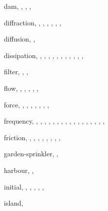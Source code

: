 \documentclass[12pt]{book}
\begin{document}
\begin{theindex}
  \indexspace

  \item dam, , , , 
  \item diffraction, , , , 
		, , , 
  \item diffusion, , 
  \item dissipation, , , , 
		, , 
		, , , 
		, , , 

  \indexspace

  \item filter, , , 
  \item flow, , , , 
		, , 
  \item force, , , , 
		, , , 
		, 
  \item frequency, , , , 
		, , , 
		, , , 
		, , , 
		, , 
		, , , 
  \item friction, , , , 
		, , , 
		, , 

  \indexspace

  \item garden-sprinkler, , 

  \indexspace

  \item harbour, , 

  \indexspace

  \item initial, , , , 
		, , 
  \item island, 


\end{theindex}
\end{document}
